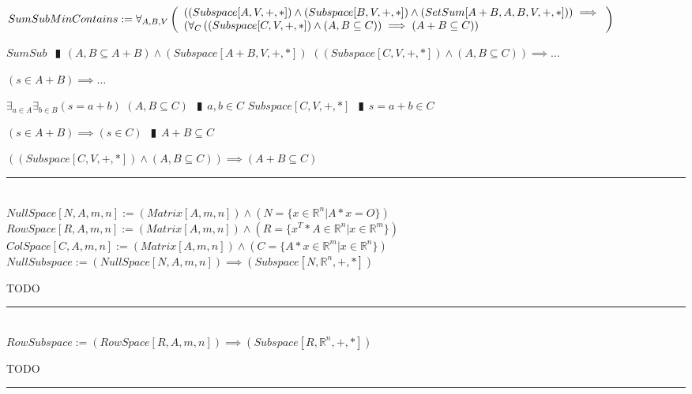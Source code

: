 \documentclass{book}
\newcommand{\abr}{:=}
\newcommand{\pipe}{$\phantom{(}\vrectangleblack\phantom{)}$}
\newcommand{\pr}[1]{\left(#1\right)}
\begin{document}
$SumSubMinContains \abr \forall_{A, B, V}\left(\begin{array}{ll}
  \pr{(Subspace[A, V, +, *]) \land (Subspace[B, V, +, *]) \land (SetSum[A + B, A, B, V, +, *])} \hfill \implies \hfill \\
  \pr{\forall_{C}\pr{(Subspace[C, V, + ,*]) \land (A, B \subseteq C)} \implies (A + B \subseteq C)}
\end{array}\right)$
\begin{enumerate}
  \lit $SumSub$ \pipe $(A, B \subseteq A + B) \land (Subspace[A + B, V, + ,*])$
  \lit $\pr{(Subspace[C, V, + ,*]) \land (A, B \subseteq C)} \implies \ldots$
  \begin{enumerate}
    \lit $(s \in A + B) \implies \ldots$
    \begin{enumerate}
      \lit $\exists_{a \in A} \exists_{b \in B}(s = a + b)$
      \lit $(A, B \subseteq C)$ \pipe $a, b \in C$
      \lit $Subspace[C, V, + ,*]$ \pipe $s = a + b \in C$
    \end{enumerate}
    \lit $(s \in A + B) \implies (s \in C)$ \pipe $A + B \subseteq C$
  \end{enumerate}
  \lit $\pr{(Subspace[C, V, + ,*]) \land (A, B \subseteq C)} \implies (A + B \subseteq C)$
\end{enumerate} \vspace{.75mm} \hrule \vspace{.75mm} \ \\ 

$NullSpace[N, A, m, n] \abr (Matrix[A, m, n]) \land (N = \{x \in \mathbb{R}^n | A * x = O\})$ \\  %
$RowSpace[R, A, m, n] \abr (Matrix[A, m, n]) \land (R = \{x^T * A \in \mathbb{R}^n | x \in \mathbb{R}^m\})$ \\  %
$ColSpace[C, A, m, n] \abr (Matrix[A, m, n]) \land (C = \{A * x \in \mathbb{R}^m | x \in \mathbb{R}^n\})$ \\  %

$NullSubspace \abr (NullSpace[N, A, m, n]) \implies (Subspace[N, \mathbb{R}^n, +, *])$
\begin{enumerate}
  \lit TODO
\end{enumerate} \vspace{.75mm} \hrule \vspace{.75mm} \ \\ 

$RowSubspace \abr (RowSpace[R, A, m, n]) \implies (Subspace[R, \mathbb{R}^n, +, *])$
\begin{enumerate}
  \lit TODO
\end{enumerate} \vspace{.75mm} \hrule \vspace{.75mm} \ \\ 
\end{document}
